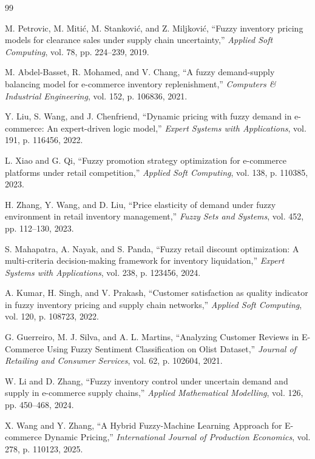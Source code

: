 \documentclass[conference]{IEEEtran}
\begin{document}
\begin{thebibliography}{99}

M. Petrovic, M. Miti{\'c}, M. Stankovi{\'c}, and Z. Miljkovi{\'c}, ``Fuzzy inventory pricing models for clearance sales under supply chain uncertainty,'' \textit{Applied Soft Computing}, vol. 78, pp. 224--239, 2019.

M. Abdel-Basset, R. Mohamed, and V. Chang, ``A fuzzy demand-supply balancing model for e-commerce inventory replenishment,'' \textit{Computers \& Industrial Engineering}, vol. 152, p. 106836, 2021.

Y. Liu, S. Wang, and J. Chenfriend, ``Dynamic pricing with fuzzy demand in e-commerce: An expert-driven logic model,'' \textit{Expert Systems with Applications}, vol. 191, p. 116456, 2022.

L. Xiao and G. Qi, ``Fuzzy promotion strategy optimization for e-commerce platforms under retail competition,'' \textit{Applied Soft Computing}, vol. 138, p. 110385, 2023.

H. Zhang, Y. Wang, and D. Liu, ``Price elasticity of demand under fuzzy environment in retail inventory management,'' \textit{Fuzzy Sets and Systems}, vol. 452, pp. 112--130, 2023.

S. Mahapatra, A. Nayak, and S. Panda, ``Fuzzy retail discount optimization: A multi-criteria decision-making framework for inventory liquidation,'' \textit{Expert Systems with Applications}, vol. 238, p. 123456, 2024.

A. Kumar, H. Singh, and V. Prakash, ``Customer satisfaction as quality indicator in fuzzy inventory pricing and supply chain networks,'' \textit{Applied Soft Computing}, vol. 120, p. 108723, 2022.

G. Guerreiro, M. J. Silva, and A. L. Martins, ``Analyzing Customer Reviews in E-Commerce Using Fuzzy Sentiment Classification on Olist Dataset,'' \textit{Journal of Retailing and Consumer Services}, vol. 62, p. 102604, 2021.

W. Li and D. Zhang, ``Fuzzy inventory control under uncertain demand and supply in e-commerce supply chains,'' \textit{Applied Mathematical Modelling}, vol. 126, pp. 450--468, 2024.

X. Wang and Y. Zhang, ``A Hybrid Fuzzy-Machine Learning Approach for E-commerce Dynamic Pricing,'' \textit{International Journal of Production Economics}, vol. 278, p. 110123, 2025.


\end{thebibliography}
\end{document}
